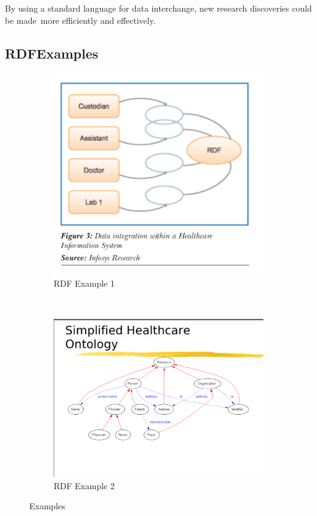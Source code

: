\documentclass[DIV=calc, paper=a4, fontsize=12pt, onecolumn]{scrartcl}	 %
\begin{document}
  \noindent By using a standard language for data interchange, new research discoveries could be made\
  more efficiently and effectively.\

  \subsection{RDFExamples}
  \begin{figure}[h!]
    \begin{subfigure}[b]{.5\linewidth}
      \includegraphics[width=1.0\textwidth]{rdfh.png}
      \caption{RDF Example 1}
      \label{fig:third}
    \end{subfigure}
    ~
    \begin{subfigure}[b]{.5\linewidth}
      \includegraphics[trim = 2 1 1 7,clip,width=\textwidth]{rdf1.png}
      \caption{RDF Example 2}
      \label{fig:fourth}
    \end{subfigure}
    \caption{Examples}
    \label{fig:rdf_examples}
  \end{figure}
\end{document}
